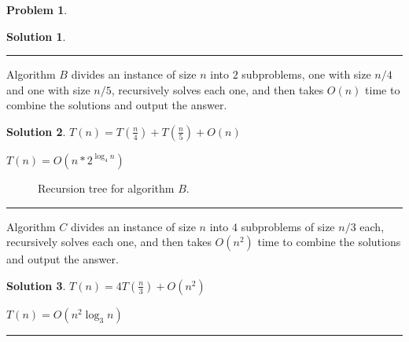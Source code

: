 \documentclass{article}
\theoremstyle{definition}
\newtheorem{problem}{Problem}
\def\fline{\rule{0.75\linewidth}{0.5pt}}
\newcommand{\finishline}{\begin{center}\fline\end{center}}
\newtheorem*{solution*}{Solution}
\newenvironment{solution}{\begin{solution*}}{{\finishline} \end{solution*}}
\begin{document}
\begin{problem}
\begin{enumerate}[label=(\Alph*)]
\begin{solution}
\end{solution}

		\item Algorithm $B$ divides an instance of size $n$ into $2$ subproblems, one with size $n/4$ and one with size $n/5$, recursively solves each one, and then takes $O(n)$ time 
		to combine the solutions and output the answer. 
		
		    \begin{solution}
	\item $T(n) = T(\frac{n}{4}) + T(\frac{n}{5}) + O(n)$
	\item $T(n) = O(n*2^{\log_4 n})$
	
			\begin{figure}[h!]
			\centering
		\caption{Recursion tree for algorithm $B$.} 
		\end{figure}
		
\end{solution}

		\item Algorithm $C$ divides an instance of size $n$ into $4$ subproblems of size $n/3$ each, recursively solves each one, and then takes $O(n^2)$ time 
		to combine the solutions and output the answer. 
		
		    \begin{solution}
	\item $T(n) = 4T(\frac{n}{3}) + O(n^2)$
	\item $T(n) = O(n^2  \log_3 n)$
	

\end{solution}
\end{enumerate}
\end{problem}
\end{document}
